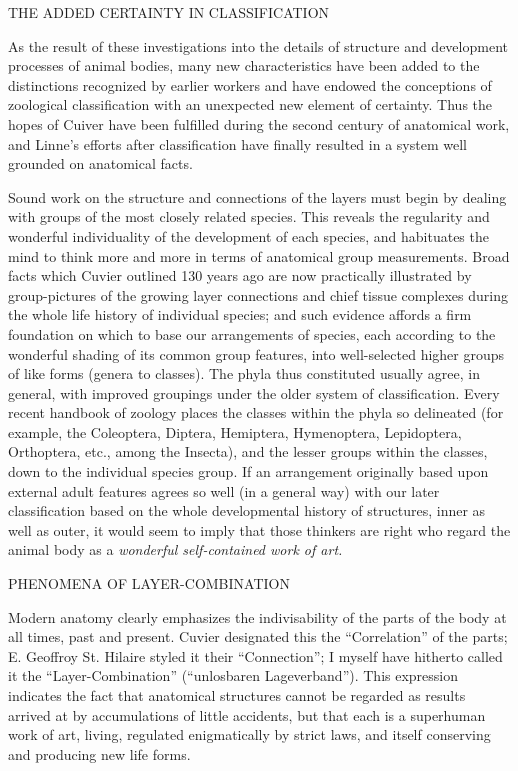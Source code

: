 THE ADDED CERTAINTY IN CLASSIFICATION

As the result of these investigations into the details of structure and development processes of
animal bodies, many new characteristics have been added to the distinctions recognized by
earlier workers and have endowed the conceptions of zoological classification with an
unexpected new element of certainty. Thus the hopes of Cuiver have been fulfilled during the
second century of anatomical work, and Linne's efforts after classification have finally
resulted in a system well grounded on anatomical facts.

Sound work on the structure and connections of the layers must begin by dealing with groups
of the most closely related species. This reveals the regularity and wonderful individuality of
the development of each species, and habituates the mind to think more and more in terms of
anatomical group measurements. Broad facts which Cuvier outlined 130 years ago are now
practically illustrated by group-pictures of the growing layer connections and chief tissue
complexes during the whole life history of individual species; and such evidence affords a
firm foundation on which to base our arrangements of species, each according to the
wonderful shading of its common group features, into well-selected higher groups of like
forms (genera to classes). The phyla thus constituted usually agree, in general, with improved
groupings under the older system of classification. Every recent handbook of zoology places
the classes within the phyla so delineated (for example, the Coleoptera, Diptera, Hemiptera,
Hymenoptera, Lepidoptera, Orthoptera, etc., among the Insecta), and the lesser groups within
the classes, down to the individual species group. If an arrangement originally based upon
external adult features agrees so well (in a general way) with our later classification based on
the whole developmental history of structures, inner as well as outer, it would seem to imply
that those thinkers are right who regard the animal body as a \textit{wonderful self-contained work
of art.}

PHENOMENA OF LAYER-COMBINATION

Modern anatomy clearly emphasizes the indivisability of the parts of the body at all times,
past and present. Cuvier designated this the ``Correlation'' of the parts; E. Geoffroy St. Hilaire
styled it their ``Connection''; I myself have hitherto called it the ``Layer-Combination''
(``unlosbaren Lageverband''). This expression indicates the fact that anatomical structures
cannot be regarded as results arrived at by accumulations of little accidents, but that each is a
superhuman work of art, living, regulated enigmatically by strict laws, and itself conserving
and producing new life forms.

